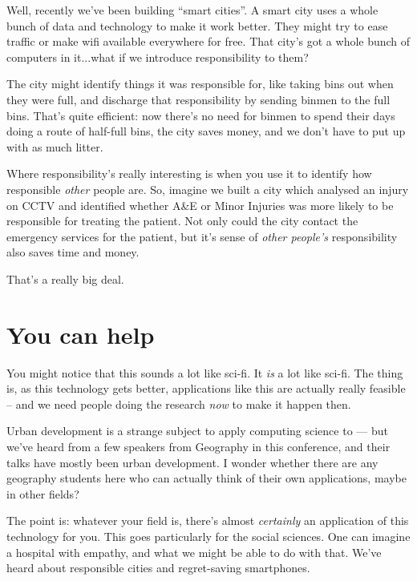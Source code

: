 \documentclass[draft]{tufte-handout}
\begin{document}

Well, recently we've been building ``smart cities''. A smart city uses a whole bunch of data and technology to make it work better. They might try to ease traffic or make wifi available everywhere for free. That city's got a whole bunch of computers in it...what if we introduce responsibility to them?\par

The city might identify things it was responsible for, like taking bins out when they were full, and discharge that responsibility by sending binmen to the full bins. That's quite efficient: now there's no need for binmen to spend their days doing a route of half-full bins, the city saves money, and we don't have to put up with as much litter.\par

Where responsibility's really interesting is when you use it to identify how responsible \emph{other} people are. So, imagine we built a city which analysed an injury on CCTV and identified whether A\&E or Minor Injuries was more likely to be responsible for treating the patient. Not only could the city contact the emergency services for the patient, but it's sense of \emph{other people's} responsibility also saves time and money.\par

That's a really big deal.\par

\section{You can help}
You might notice that this sounds a lot like sci-fi. It \emph{is} a lot like sci-fi. The thing is, as this technology gets better, applications like this are actually really feasible -- and we need people doing the research \emph{now} to make it happen then.\par
Urban development is a strange subject to apply computing science to --- but we've heard from a few speakers from Geography in this conference, and their talks have mostly been urban development. I wonder whether there are any geography students here who can actually think of their own applications, maybe in other fields?\par

The point is: whatever your field is, there's almost \emph{certainly} an application of this technology for you. This goes particularly for the social sciences. One can imagine a hospital with empathy, and what we might be able to do with that. We've heard about responsible cities and regret-saving smartphones.\par
\end{document}
